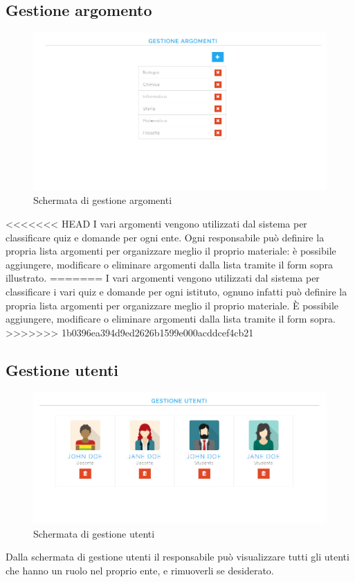 \documentclass[a4paper, titlepage]{article}
\begin{document}
	 \subsection{Gestione argomento}
	 \begin{figure}[!h]
	 	\centering
	 	\includegraphics[scale=0.33]{Img/screen_GestioneArgomenti.png}
	 	\caption{Schermata di gestione argomenti}
	 \end{figure}
<<<<<<< HEAD
	 I vari argomenti vengono utilizzati dal sistema per classificare quiz e domande per ogni ente. Ogni responsabile può definire la propria lista argomenti per organizzare meglio il proprio materiale: è possibile aggiungere, modificare o eliminare argomenti dalla lista tramite il form sopra illustrato.
=======
	 I vari argomenti vengono utilizzati dal sistema per classificare i vari quiz e domande per ogni istituto, ognuno infatti può definire la propria lista argomenti per organizzare meglio il proprio materiale. È possibile aggiungere, modificare o eliminare argomenti dalla lista tramite il form sopra.
>>>>>>> 1b0396ea394d9ed2626b1599e000acddcef4cb21
	 
	 \subsection{Gestione utenti}
	 \begin{figure}[!h]
	 	\centering
	 	\includegraphics[scale=0.33]{Img/screen_GestioneUtenti.png}
	 	\caption{Schermata di gestione utenti}
	 \end{figure}
	 Dalla schermata di gestione utenti il responsabile può visualizzare tutti gli utenti che hanno un ruolo nel proprio ente, e rimuoverli se desiderato.
	 
\end{document}
